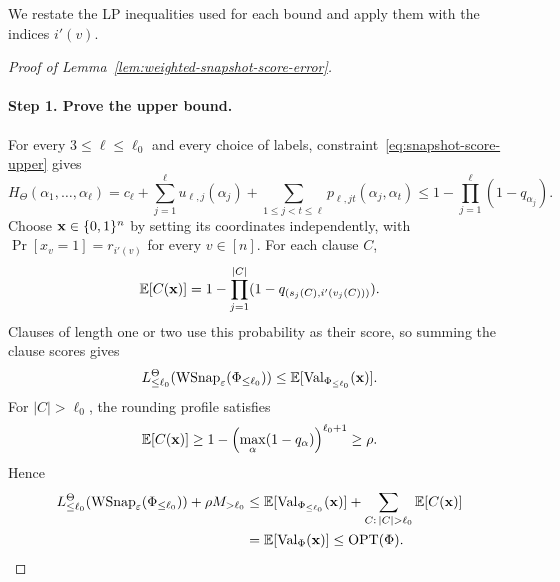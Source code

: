 We restate the LP inequalities used for each bound and apply them with the indices $i'(v)$.
\begin{proof}[Proof of Lemma~\ref{lem:weighted-snapshot-score-error}]
\leavevmode\par
\paragraph{Step 1. Prove the upper bound.}
For every $3\le\ell\le\ell_0$ and every choice of labels, constraint~\eqref{eq:snapshot-score-upper} gives
\[
  H_\Theta(\alpha_1,\ldots,\alpha_\ell)
  =c_\ell+\sum_{j=1}^\ell u_{\ell,j}(\alpha_j)
   +\sum_{1\le j<t\le\ell}p_{\ell,jt}(\alpha_j,\alpha_t)
  \le1-\prod_{j=1}^\ell(1-q_{\alpha_j}).
\]
Choose $\mathbf{x}\in\{0,1\}^n$ by setting its coordinates independently, with $\Pr[x_v=1]=r_{i'(v)}$ for every $v\in[n]$.
For each clause $C$,
\[
  \mathbb E[C(\mathbf{x})]=1-\prod_{j=1}^{|C|}(1-q_{(s_j(C),i'(v_j(C)))}).
\]
Clauses of length one or two use this probability as their score, so summing the clause scores gives
\[
  L_{\le\ell_0}^\Theta(\operatorname{WSnap}_{\varepsilon}(\Phi_{\le\ell_0}))
  \le\mathbb E[\operatorname{Val}_{\Phi_{\le\ell_0}}(\mathbf{x})].
\]
For $|C|>\ell_0$, the rounding profile satisfies
\[
  \mathbb E[C(\mathbf{x})]
  \ge1-\left(\max_\alpha(1-q_\alpha)\right)^{\ell_0+1}
  \ge\rho.
\]
Hence
\[
\begin{aligned}
  L_{\le\ell_0}^\Theta(\Snap_{\eps}(\Phi_{\le\ell_0}))+\rho M_{>\ell_0}
  &\le\E[\Val_{\Phi_{\le\ell_0}}(\bx)]
       +\sum_{C:\,|C|>\ell_0}\E[C(\bx)]\\
  &=\E[\Val_\Phi(\bx)]\le\OPT(\Phi).
\end{aligned}
\]


\end{proof}

